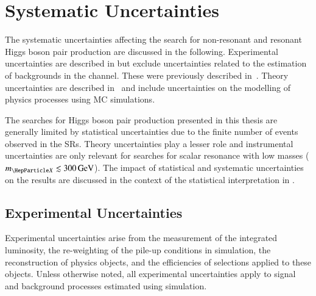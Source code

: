 \section{Systematic Uncertainties}%
\label{sec:uncertainties}

The systematic uncertainties affecting the search for non-resonant and resonant
Higgs boson pair production are discussed in the following. Experimental
uncertainties are described in  but exclude
uncertainties related to the estimation of \faketauhadvisC backgrounds in the
\hadhad channel. These were previously described
in~. Theory uncertainties are
described in~ and include uncertainties on the
modelling of physics processes using MC simulations.

The searches for Higgs boson pair production presented in this thesis are
generally limited by statistical uncertainties due to the finite number of
events observed in the SRs. Theory uncertainties play a lesser role and
instrumental uncertainties are only relevant for searches for scalar resonance
with low masses ($\mX \lesssim \SI{300}{\GeV}$). The impact of statistical and
systematic uncertainties on the results are discussed in the context of the
statistical interpretation in .


\subsection{Experimental Uncertainties}%
\label{sec:experimental_uncertainties}

Experimental uncertainties arise from the measurement of the integrated
luminosity, the re-weighting of the pile-up conditions in simulation, the
reconstruction of physics objects, and the efficiencies of selections applied to
these objects. Unless otherwise noted, all experimental uncertainties apply to
signal and background processes estimated using simulation.

